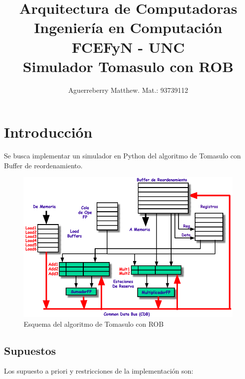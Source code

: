 \documentclass[a4paper]{article}
\begin{document}
	
	\title{%
	  Arquitectura de Computadoras \\
	  \large Ingeniería en Computación FCEFyN - UNC\\
			  Simulador Tomasulo con ROB
	  }
	
	
	  \author{Aguerreberry Matthew. Mat.: 93739112}
	  
	  \maketitle
	  
	  \section{Introducción}
	  
	  Se busca implementar un simulador en Python del algoritmo de Tomasulo con Buffer de reordenamiento.
	  
	  \begin{figure}[H]
	  \centering
	  \includegraphics[width=.7\textwidth]{figures/esquema.png}
	  \caption{\label{fig:bloques}Esquema del algoritmo de Tomasulo con ROB}
	  \end{figure}

		
	\subsection{Supuestos}
	
	  Los supuesto a priori y restricciones de la implementación son:
\end{document}
